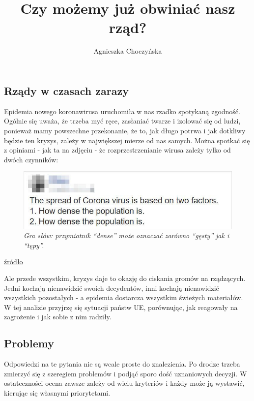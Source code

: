 \documentclass[
]{article}
\title{Czy możemy już obwiniać nasz rząd?}
\author{Agnieszka Choczyńska}
\date{}
\begin{document}
\maketitle

\hypertarget{rzux105dy-w-czasach-zarazy}{%
\subsection{Rządy w czasach zarazy}\label{rzux105dy-w-czasach-zarazy}}

Epidemia nowego koronawirusa uruchomiła w nas rzadko spotykaną zgodność.
Ogólnie się uważa, że trzeba myć ręce, zasłaniać twarze i izolować się
od ludzi, ponieważ mamy powszechne przekonanie, że to, jak długo potrwa
i jak dotkliwy będzie ten kryzys, zależy w największej mierze od nas
samych. Można spotkać się z opiniami - jak ta na zdjęciu - że
rozprzestrzenianie wirusa zależy tylko od dwóch czynników:

\begin{figure}
\centering
\includegraphics{joke.jpg}
\caption{\emph{Gra słów: przymiotnik ``dense'' może oznaczać zarówno
``gęsty'' jak i ``tępy''.}}
\end{figure}

\href{https://www.boredpanda.com/coronavirus-covid-19-jokes/?utm_source=pl.pinterest\&utm_medium=referral\&utm_campaign=organic}{źródło}

Ale przede wszystkim, kryzys daje to okazję do ciskania gromów na
rządzących. Jedni kochają nienawidzić swoich decydentów, inni kochają
nienawidzić wszystkich pozostałych - a epidemia dostarcza wszystkim
świeżych materiałów. W tej analizie przyjrzę się sytuacji państw UE,
porównując, jak reagowały na zagrożenie i jak sobie z nim radziły.

\hypertarget{problemy}{%
\subsection{Problemy}\label{problemy}}

Odpowiedzi na te pytania nie są wcale proste do znalezienia. Po drodze
trzeba zmierzyć się z szeregiem problemów i podjąć sporo dość
uznaniowych decyzji. W ostateczności ocena zawsze zależy od wielu
kryteriów i każdy może ją wystawić, kierując się własnymi priorytetami.
\end{document}
